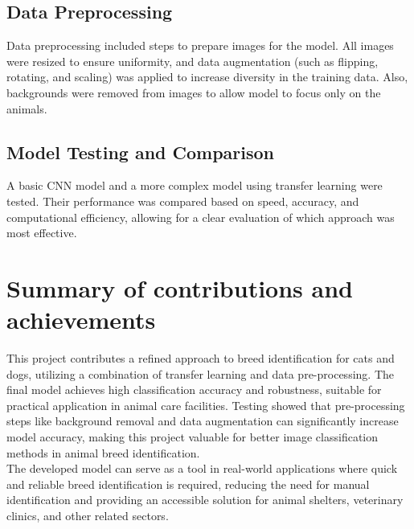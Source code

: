 \subsection{Data Preprocessing}
\label{sec:intro_some_sub1}
Data preprocessing included steps to prepare images for the model. All images were resized to ensure uniformity, and data augmentation (such as flipping, rotating, and scaling) was applied to increase diversity in the training data. Also, backgrounds were removed from images to allow model to focus only on the animals.

\subsection{ Model Testing and Comparison}
\label{sec:intro_some_sub2}
A basic CNN model and a more complex model using transfer learning were tested. Their performance was compared based on speed, accuracy, and computational efficiency, allowing for a clear evaluation of which approach was most effective.

\section{Summary of contributions and achievements} %
\label{sec:intro_sum_results}
This project contributes a refined approach to breed identification for cats and dogs, utilizing a combination of transfer learning and data pre-processing. The final model achieves high classification accuracy and robustness, suitable for practical application in animal care facilities. Testing showed that pre-processing steps like background removal and data augmentation can significantly increase model accuracy, making this project valuable for better image classification methods in animal breed identification.\\[0.05cm]
\noindent
The developed model can serve as a tool in real-world applications where quick and reliable breed identification is required, reducing the need for manual identification and providing an accessible solution for animal shelters, veterinary clinics, and other related sectors.

